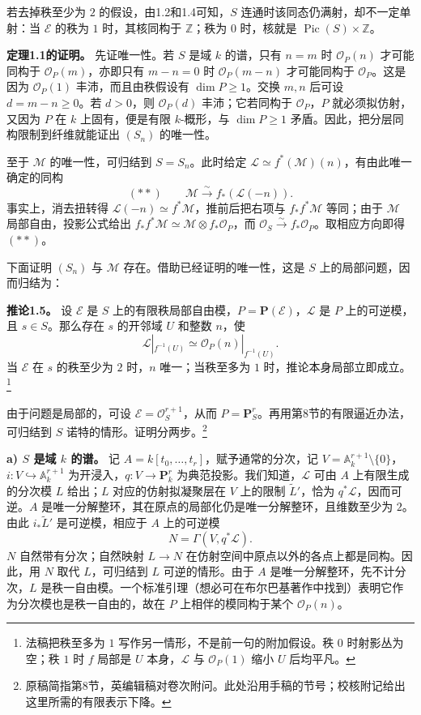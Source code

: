 \documentclass[openany,fontset=fandol]{ctexbook}
\newcommand{\OO}{\mathcal O}
\newcommand{\LL}{\mathcal L}
\newcommand{\MM}{\mathcal M}
\newcommand{\EE}{\mathcal E}
\DeclareMathOperator{\Pic}{Pic}
\begin{document}
若去掉秩至少为 \(2\) 的假设，由1.2和1.4可知，\(S\) 连通时该同态仍满射，却不一定单射：当 \(\EE\) 的秩为 \(1\) 时，其核同构于 \(\mathbb Z\)；秩为 \(0\) 时，核就是 \(\Pic(S)\times\mathbb Z\)。

\medskip\noindent\textbf{定理1.1的证明。}
先证唯一性。若 \(S\) 是域 \(k\) 的谱，只有 \(n=m\) 时 \(\OO_P(n)\) 才可能同构于 \(\OO_P(m)\)，亦即只有 \(m-n=0\) 时 \(\OO_P(m-n)\) 才可能同构于 \(\OO_P\)。这是因为 \(\OO_P(1)\) 丰沛，而且由秩假设有 \(\dim P\ge 1\)。交换 \(m,n\) 后可设 \(d=m-n\ge 0\)。若 \(d>0\)，则 \(\OO_P(d)\) 丰沛；它若同构于 \(\OO_P\)，\(P\) 就必须拟仿射，又因为 \(P\) 在 \(k\) 上固有，便是有限 \(k\)-概形，与 \(\dim P\ge 1\) 矛盾。因此，把分层同构限制到纤维就能证出 \((S_n)\) 的唯一性。

至于 \(\MM\) 的唯一性，可归结到 \(S=S_n\)。此时给定 \(\LL\simeq f^*(\MM)(n)\)，有由此唯一确定的同构
\[
(**)\qquad \MM\xrightarrow{\sim}f_*(\LL(-n)).
\]
事实上，消去扭转得 \(\LL(-n)\simeq f^*\MM\)，推前后把右项与 \(f_*f^*\MM\) 等同；由于 \(\MM\) 局部自由，投影公式给出 \(f_*f^*\MM\simeq \MM\otimes f_*\OO_P\)，而 \(\OO_S\xrightarrow{\sim}f_*\OO_P\)。取相应方向即得 \((**)\)。

下面证明 \((S_n)\) 与 \(\MM\) 存在。借助已经证明的唯一性，这是 \(S\) 上的局部问题，因而归结为：

\medskip\noindent\textbf{推论1.5。}
设 \(\EE\) 是 \(S\) 上的有限秩局部自由模，\(P=\mathbf P(\EE)\)，\(\LL\) 是 \(P\) 上的可逆模，且 \(s\in S\)。那么存在 \(s\) 的开邻域 \(U\) 和整数 \(n\)，使
\[
 \LL|_{f^{-1}(U)}\simeq \OO_P(n)|_{f^{-1}(U)} .
\]
当 \(\EE\) 在 \(s\) 的秩至少为 \(2\) 时，\(n\) 唯一；当秩至多为 \(1\) 时，推论本身局部立即成立。\footnote{法稿把秩至多为 \(1\) 写作另一情形，不是前一句的附加假设。秩 \(0\) 时射影丛为空；秩 \(1\) 时 \(f\) 局部是 \(U\) 本身，\(\LL\) 与 \(\OO_P(1)\) 缩小 \(U\) 后均平凡。}

由于问题是局部的，可设 \(\EE=\OO_S^{r+1}\)，从而 \(P=\mathbf P_S^r\)。再用第8节的有限逼近办法，可归结到 \(S\) 诺特的情形。证明分两步。\footnote{原稿简指第8节，英编辑稿对卷次附问。此处沿用手稿的节号；校核附记给出这里所需的有限表示下降。}

\medskip\noindent\textbf{a) \(S\) 是域 \(k\) 的谱。}
记 \(A=k[t_0,\ldots,t_r]\)，赋予通常的分次，记 \(V=\mathbb A_k^{r+1}\setminus\{0\}\)，\(i:V\hookrightarrow\mathbb A_k^{r+1}\) 为开浸入，\(q:V\to\mathbf P_k^r\) 为典范投影。我们知道，\(\LL\) 可由 \(A\) 上有限生成的分次模 \(L\) 给出；\(L\) 对应的仿射拟凝聚层在 \(V\) 上的限制 \(\widetilde L'\)，恰为 \(q^*\LL\)，因而可逆。\(A\) 是唯一分解整环，其在原点的局部化仍是唯一分解整环，且维数至少为 \(2\)。由此 \(i_*\widetilde L'\) 是可逆模，相应于 \(A\) 上的可逆模
\[
N=\Gamma(V,q^*\LL).
\]
\(N\) 自然带有分次；自然映射 \(L\to N\) 在仿射空间中原点以外的各点上都是同构。因此，用 \(N\) 取代 \(L\)，可归结到 \(L\) 可逆的情形。由于 \(A\) 是唯一分解整环，先不计分次，\(L\) 是秩一自由模。一个标准引理（想必可在布尔巴基著作中找到）表明它作为分次模也是秩一自由的，故在 \(P\) 上相伴的模同构于某个 \(\OO_P(n)\)。
\end{document}
